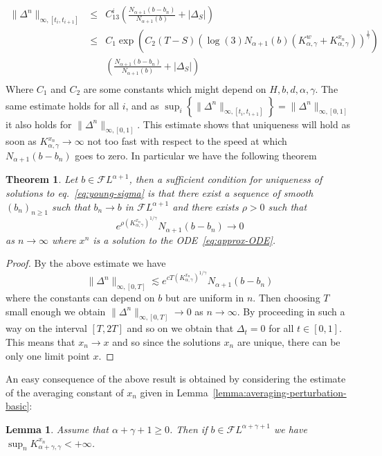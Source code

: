 \documentclass[11pt,a4paper,draft,reqno]{amsart}
\newtheorem{lemma}{Lemma}
\newtheorem{theorem}{Theorem}
\theoremstyle{definition}
\newcommand{\cF}{\mathcal{F}}
\begin{document}
\begin{eqnarray*}
\|\Delta^n\|_{\infty,[t_i,t_{i+1}]}
&\le&
C_13^i\left(\frac{N_{\alpha+1}(b-b_n)}{N_{\alpha+1}(b)}+\left|\Delta_S\right|\right)\\
&\le&
C_1\exp\left(C_2(T-S)\left(\log(3)N_{\alpha+1}(b)(K^w_{\alpha,\gamma}+K^{x_n}_{\alpha,\gamma})\right)^{\frac1\gamma}\right)\\
&&{}{}{}\left(\frac{N_{\alpha+1}(b-b_n)}{N_{\alpha+1}(b)}+\left|\Delta_S\right|\right)\\
\end{eqnarray*}
Where $C_1$ and $C_2$ are some constants which might depend on $H,b,d,\alpha,\gamma$. The same estimate holds for all $i$, and as $\sup_i \left\{\|\Delta^n\|_{\infty,[t_i,t_{i+1}]}\right\}=\|\Delta^n\|_{\infty,[0,1]}$ it also holds for $\|\Delta^n\|_{\infty,[0,1]}$.
This estimate shows that uniqueness will hold as soon as $K^{x_n}_{\alpha,\gamma} \to \infty$ not too fast with respect to the speed at which $N_{\alpha+1}(b-b_n)$ goes to zero. In particular we have the following theorem
\begin{theorem}
\label{th:uniqueness-approx}
Let $b\in \cF L^{\alpha+1}$, then a sufficient condition for uniqueness of solutions to
 eq.~\eqref{eq:young-sigma} is that there exist a sequence of smooth $(b_n)_{n\ge 1}$ such that $b_n \to b$ in $\cF L^{\alpha+1}$ and there exists $\rho > 0$ such that
$$
e^{\rho (K^{x_n}_{\alpha,\gamma})^{1/\gamma}} N_{\alpha+1}(b-b_n)\to 0
$$ 
as $n\to\infty$ where $x^n$ is a solution to the ODE~\eqref{eq:approx-ODE}.
\end{theorem}
\begin{proof}
By the above estimate we have
$$
\|\Delta^n\|_{\infty,[0,T]} \lesssim e^{c T (K^{x_n}_{\alpha,\gamma})^{1/\gamma}} N_{\alpha+1}(b-b_n)
$$
where the constants can depend on $b$ but are uniform in $n$. Then choosing $T$ small enough we obtain $\|\Delta^n\|_{\infty,[0,T]} \to 0$ as $n\to \infty$. By proceeding in such a way on the interval $[T, 2T]$ and so on we obtain that $\Delta_t = 0$ for all $t\in [0,1]$. This means that $x_n \to x$ and so since the solutions $x_n$ are unique, there can be only one limit point $x$.
\end{proof}
\bigskip
An easy consequence of the above result is obtained by considering the estimate of the averaging constant of $x_n$ given in Lemma~\ref{lemma:averaging-perturbation-basic}:
\begin{lemma}
\label{lemma:averaging-perturbation}
Assume that $\alpha+\gamma+1\ge 0$. Then if $b\in \cF L^{\alpha+\gamma+1}$ we have $\sup_n K^{x_n}_{\alpha+\gamma,\gamma}<+\infty$.
\end{lemma}
\end{document}
